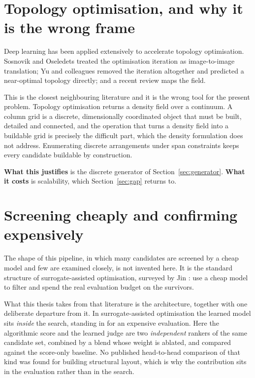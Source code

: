 \section{Topology optimisation, and why it is the wrong frame}

Deep learning has been applied extensively to accelerate topology
optimisation. Sosnovik and Oseledets \citep{sosnovik2019nn4topopt} treated
the optimisation iteration as image-to-image translation; Yu and
colleagues \citep{yu2019neartopo} removed the iteration altogether and
predicted a near-optimal topology directly; and a recent review
\citep{topopt2023review} maps the field.

This is the closest neighbouring literature and it is the wrong tool for
the present problem. Topology optimisation returns a density field over a
continuum. A column grid is a discrete, dimensionally coordinated object
that must be built, detailed and connected, and the operation that turns a
density field into a buildable grid is precisely the difficult part, which
the density formulation does not address. Enumerating discrete
arrangements under span constraints keeps every candidate buildable by
construction.

\textbf{What this justifies} is the discrete generator of
Section~\ref{sec:generator}. \textbf{What it costs} is scalability, which
Section~\ref{sec:gap} returns to.

\section{Screening cheaply and confirming expensively}

The shape of this pipeline, in which many candidates are screened by a
cheap model and few are examined closely, is not invented here. It is the
standard structure of surrogate-assisted optimisation, surveyed by Jin
\citep{jin2011surrogate}: use a cheap model to filter and spend the real
evaluation budget on the survivors.

What this thesis takes from that literature is the architecture, together
with one deliberate departure from it. In surrogate-assisted optimisation
the learned model sits \emph{inside} the search, standing in for an
expensive evaluation. Here the algorithmic score and the learned judge are
two \emph{independent} rankers of the same candidate set, combined by a
blend whose weight is ablated, and compared against the score-only
baseline. No published head-to-head comparison of that kind was found for
building structural layout, which is why the contribution sits in the
evaluation rather than in the search.

